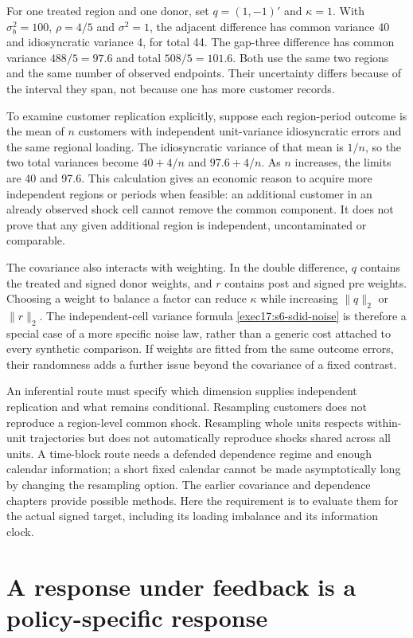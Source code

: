 For one treated region and one donor, set $q=(1,-1)'$ and
$\kappa=1$. With $\sigma_b^2=100$, $\rho=4/5$ and $\sigma^2=1$,
the adjacent difference has common variance 40 and idiosyncratic variance
4, for total 44. The gap-three difference has common variance
$488/5=97.6$ and total $508/5=101.6$. Both use the same two
regions and the same number of observed endpoints. Their uncertainty
differs because of the interval they span, not because one has more
customer records.\citep{exec17_s6_math}

To examine customer replication explicitly, suppose each region-period
outcome is the mean of $n$ customers with independent unit-variance
idiosyncratic errors and the same regional loading. The idiosyncratic
variance of that mean is $1/n$, so the two total variances become
$40+4/n$ and $97.6+4/n$. As $n$ increases, the limits are 40
and 97.6. This calculation gives an economic reason to acquire more
independent regions or periods when feasible: an additional customer in
an already observed shock cell cannot remove the common component.
It does not prove that any given additional region is independent,
uncontaminated or comparable.

The covariance also interacts with weighting. In the double difference,
$q$ contains the treated and signed donor weights, and $r$ contains
post and signed pre weights. Choosing a weight to balance a factor can
reduce $\kappa$ while increasing $\|q\|_2$ or $\|r\|_2$.
The independent-cell variance formula
\eqref{exec17:s6-sdid-noise} is therefore a special case of a more
specific noise law, rather than a generic cost attached to every
synthetic comparison. If weights are fitted from the same outcome
errors, their randomness adds a further issue beyond the covariance
of a fixed contrast.

An inferential route must specify which dimension supplies independent
replication and what remains conditional. Resampling customers does not
reproduce a region-level common shock. Resampling whole units respects
within-unit trajectories but does not automatically reproduce shocks
shared across all units. A time-block route needs a defended dependence
regime and enough calendar information; a short fixed calendar cannot
be made asymptotically long by changing the resampling option. The
earlier covariance and dependence chapters provide possible methods.
Here the requirement is to evaluate them for the actual signed target,
including its loading imbalance and its information clock.

\section{A response under feedback is a policy-specific response}
\label{exec17:s6-feedback}

